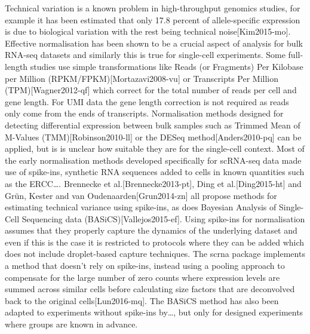\documentclass[11pt,a4paper,titlepage,twoside,openright]{style/unimelbthesis}
\theoremstyle{definition}
\theoremstyle{definition}
\theoremstyle{definition}
\theoremstyle{remark}
\begin{document}
\begin{mainmatter}
Technical variation is a known problem in high-throughput genomics studies, for example it has been estimated that only 17.8 percent of allele-specific expression is due to biological variation with the rest being technical noise{[}Kim2015-mo{]}. Effective normalisation has been shown to be a crucial aspect of analysis for bulk RNA-seq datasets and similarly this is true for single-cell experiments. Some full-length studies use simple transformations like Reads (or Fragments) Per Kilobase per Million (RPKM/FPKM){[}Mortazavi2008-vu{]} or Transcripts Per Million (TPM){[}Wagner2012-qf{]} which correct for the total number of reads per cell and gene length. For UMI data the gene length correction is not required as reads only come from the ends of transcripts. Normalisation methods designed for detecting differential expression between bulk samples such as Trimmed Mean of M-Values (TMM){[}Robinson2010-ll{]} or the DESeq method{[}Anders2010-pq{]} can be applied, but is is unclear how suitable they are for the single-cell context. Most of the early normalisation methods developed specifically for scRNA-seq data made use of spike-ins, synthetic RNA sequences added to cells in known quantities such as the ERCC\ldots{}. Brennecke et al.{[}Brennecke2013-pt{]}, Ding et al.{[}Ding2015-ht{]} and Grün, Kester and van Oudenaarden{[}Grun2014-zn{]} all propose methods for estimating technical variance using spike-ins, as does Bayesian Analysis of Single-Cell Sequencing data (BASiCS){[}Vallejos2015-ef{]}. Using spike-ins for normalisation assumes that they properly capture the dynamics of the underlying dataset and even if this is the case it is restricted to protocols where they can be added which does not include droplet-based capture techniques. The scrna package implements a method that doesn't rely on spike-ins, instead using a pooling approach to compensate for the large number of zero counts where expression levels are summed across similar cells before calculating size factors that are deconvolved back to the original cells{[}Lun2016-mq{]}. The BASiCS method has also been adapted to experiments without spike-ins by\ldots{}, but only for designed experiments where groups are known in advance.


\end{mainmatter}
\end{document}
